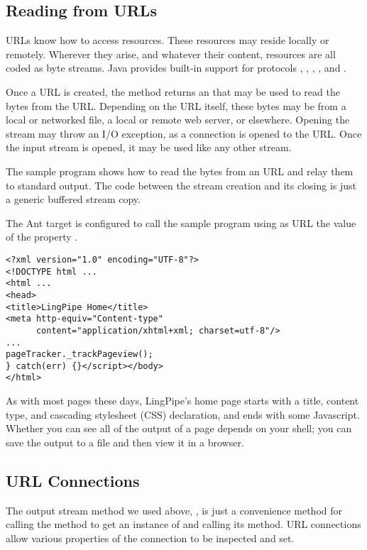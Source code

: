 \subsection{Reading from URLs}

URLs know how to access resources.  These resources may reside locally
or remotely.  Wherever they arise, and whatever their content, 
resources are all coded as byte streams.  Java provides built-in support
for protocols , , , , and 
.  

Once a URL is created, the method  returns an
 that may be used to read the bytes from the URL.
Depending on the URL itself, these bytes may be from a local or
networked file, a local or remote web server, or elsewhere.  Opening
the stream may throw an I/O exception, as a connection is opened to
the URL.  Once the input stream is opened, it may be used like
any other stream.  

The sample program  shows how to read the
bytes from an URL and relay them to standard output.
%
%
The code between the stream creation and its closing is just a generic
buffered stream copy.  

The Ant target  is configured to call the sample
program using as URL the value of the property .
%
\begin{verbatim}
<?xml version="1.0" encoding="UTF-8"?>
<!DOCTYPE html ...
<html ...
<head>
<title>LingPipe Home</title>
<meta http-equiv="Content-type"
      content="application/xhtml+xml; charset=utf-8"/>
...
pageTracker._trackPageview();
} catch(err) {}</script></body>
</html>
\end{verbatim}
%
As with most pages these days, LingPipe's home page starts with
a title, content type, and cascading stylesheet (CSS) declaration,
and ends with some Javascript.  
Whether you can see all of the output of a page depends on your
shell; you can save the output to a file and then view it in a
browser.  

\subsection{URL Connections}

The output stream method we used above, , is
just a convenience method for calling the 
method to get an instance of  and calling its
 method.  URL connections allow various
properties of the connection to be inspected and set.  

